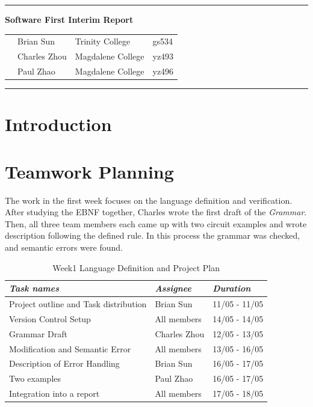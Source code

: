 \documentclass[12pt]{article}
\def\n{\noindent}
\begin{document}
\vspace{0.3cm}
\rule{15.7cm}{0.5mm}


\begin{center}
{\hspace{0.6cm}\Large \textbf {Software First Interim Report}\\
}
\end{center}
\begin{table}[H]
\centering
\begin{tabular}{ p{1.5cm}p{5cm}p{6cm} p{6cm}} 
&Brian Sun & Trinity College & gs534 \\ 
&Charles Zhou & Magdalene College & yz493 \\ 
&Paul Zhao & Magdalene College & yz496 \\ 
\end{tabular}
\end{table}


\begin{center}
\rule{15.7cm}{0.5mm}
\end{center}

\section{Introduction}
\section{Teamwork Planning}
\n The work in the first week focuses on the language definition and verification. After studying the EBNF together, Charles wrote the first draft of the \textit{Grammar}. Then, all three team members each came up with two circuit examples and wrote description following the defined rule. In this process the grammar was checked, and semantic errors were found. \\
\begin{table}[H]
\begin{tabular}{p{8cm}p{4cm}p{3cm}} 
\textit{Task names} & \textit{Assignee}&\textit{Duration}\\
\hline
Project outline and Task distribution & Brian Sun & 11/05 - 11/05\\
Version Control Setup & All members & 14/05 - 14/05\\
Grammar Draft 	& Charles Zhou & 12/05 - 13/05\\
Modification and Semantic Error & All members & 13/05 - 16/05\\
Description of Error Handling & Brian Sun & 16/05 - 17/05\\
Two examples & Paul Zhao & 16/05 - 17/05\\
Integration into a report & All members & 17/05 - 18/05\\
\end{tabular}
\caption{Week1 Language Definition and Project Plan}
\end{table}
\end{document}
